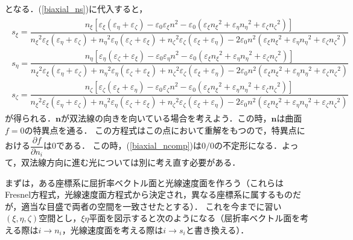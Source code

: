 となる．(\ref{biaxial_ns})に代入すると，
\begin{align}
  \begin{split}
    s_\xi=\dfrac{n_\xi\left[\varepsilon_\xi(\varepsilon_\eta+\varepsilon_\zeta)-\varepsilon_0\varepsilon_\xi{n^2}-\varepsilon_0(\varepsilon_{\xi}{n_\xi}^2+\varepsilon_{\eta}{n_\eta}^2+\varepsilon_{\zeta}{n_\zeta}^2)\right]}
    {{n_\xi}^2\varepsilon_\xi\left(\varepsilon_\eta+\varepsilon_\zeta\right)+{n_\eta}^2\varepsilon_\eta\left(\varepsilon_\zeta+\varepsilon_\xi\right)+{n_\zeta}^2\varepsilon_\zeta\left(\varepsilon_\xi+\varepsilon_\eta\right)-2\varepsilon_0n^2\left(\varepsilon_{\xi}{n_\xi}^2+\varepsilon_{\eta}{n_\eta}^2+\varepsilon_{\zeta}{n_\zeta}^2\right)}\\
    s_\eta=\dfrac{n_\eta\left[\varepsilon_\eta(\varepsilon_\zeta+\varepsilon_\xi)-\varepsilon_0\varepsilon_\eta{n^2}-\varepsilon_0(\varepsilon_{\xi}{n_\xi}^2+\varepsilon_{\eta}{n_\eta}^2+\varepsilon_{\zeta}{n_\zeta}^2)\right]}
    {{n_\xi}^2\varepsilon_\xi\left(\varepsilon_\eta+\varepsilon_\zeta\right)+{n_\eta}^2\varepsilon_\eta\left(\varepsilon_\zeta+\varepsilon_\xi\right)+{n_\zeta}^2\varepsilon_\zeta\left(\varepsilon_\xi+\varepsilon_\eta\right)-2\varepsilon_0n^2\left(\varepsilon_{\xi}{n_\xi}^2+\varepsilon_{\eta}{n_\eta}^2+\varepsilon_{\zeta}{n_\zeta}^2\right)}\\
    s_\zeta=\dfrac{n_\zeta\left[\varepsilon_\zeta(\varepsilon_\xi+\varepsilon_\eta)-\varepsilon_0\varepsilon_\zeta{n^2}-\varepsilon_0(\varepsilon_{\xi}{n_\xi}^2+\varepsilon_{\eta}{n_\eta}^2+\varepsilon_{\zeta}{n_\zeta}^2)\right]}
    {{n_\xi}^2\varepsilon_\xi\left(\varepsilon_\eta+\varepsilon_\zeta\right)+{n_\eta}^2\varepsilon_\eta\left(\varepsilon_\zeta+\varepsilon_\xi\right)+{n_\zeta}^2\varepsilon_\zeta\left(\varepsilon_\xi+\varepsilon_\eta\right)-2\varepsilon_0n^2\left(\varepsilon_{\xi}{n_\xi}^2+\varepsilon_{\eta}{n_\eta}^2+\varepsilon_{\zeta}{n_\zeta}^2\right)}
  \end{split}
  \label{biaxial_ncomp}
\end{align}
が得られる．$\boldsymbol{n}$が双法線の向きを向いている場合を考えよう．この時，$\boldsymbol{n}$は曲面$f=0$の特異点を通る．
この方程式はこの点において重解をもつので，特異点における$\dfrac{\partial{f}}{\partial{n_i}}$は0である．
この時，(\ref{biaxial_ncomp})は$0/0$の不定形になる．よって，双法線方向に進む光については別に考え直す必要がある．

まずは，ある座標系に屈折率ベクトル面と光線速度面を作ろう（これらはFresnel方程式，光線速度面方程式から決定され，異なる座標系に属するものだが，適当な目盛で両者の空間を一致させたとする）．
これを今までに習い$(\xi,\eta,\zeta)$空間とし，$\xi\eta$平面を図示すると次のようになる（屈折率ベクトル面を考える際は$i\to{}n_i$，光線速度面を考える際は$i\to{}s_i$と書き換える）．

